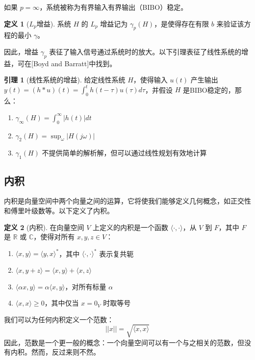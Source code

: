 \documentclass[UTF8,12pt,a4paper]{ctexart}
\theoremstyle{definition}
\newtheorem{definition}{定义}[section]
\newtheorem{lemma}{引理}[section]
\begin{document}
如果 $p=\infty$，系统被称为有界输入有界输出（BIBO）稳定。

\begin{definition}[$L_p$增益]
系统 $H$ 的 $L_p$ 增益记为 $\gamma_p(H)$，是使得存在有限 $b$ 来验证该方程的最小 $\gamma$。
\end{definition}

因此，增益 $\gamma_p$ 表征了输入信号通过系统时的放大。以下引理表征了线性系统的增益，可在[Boyd and Barratt]中找到。

\begin{lemma}[线性系统的增益]
给定线性系统 $H$，使得输入 $u(t)$ 产生输出 $y(t)=(h*u)(t)=\int_0^t h(t-\tau)u(\tau)d\tau$，并假设 $H$ 是BIBO稳定的，那么：
\begin{enumerate}
\item $\gamma_\infty(H) = \int_0^\infty |h(t)| dt$
\item $\gamma_2(H) = \sup_{\omega} |H(j\omega)|$
\item $\gamma_1(H)$ 不提供简单的解析解，但可以通过线性规划有效地计算
\end{enumerate}
\end{lemma}

\subsection{内积}

内积是向量空间中两个向量之间的运算，它将使我们能够定义几何概念，如正交性和傅里叶级数等。以下定义了内积。

\begin{definition}[内积]
在向量空间 $V$ 上定义的内积是一个函数 $\langle \cdot, \cdot \rangle$，从 $V$ 到 $F$，其中 $F$ 是 $\mathbb{R}$ 或 $\mathbb{C}$，使得对所有 $x, y, z \in V$：
\begin{enumerate}
\item $\langle x, y \rangle = \langle y, x \rangle^*$，其中 $\langle \cdot, \cdot \rangle^*$ 表示复共轭
\item $\langle x, y+z \rangle = \langle x, y \rangle + \langle x, z \rangle$
\item $\langle \alpha x, y \rangle = \alpha \langle x, y \rangle$，对所有标量 $\alpha$
\item $\langle x, x \rangle \geq 0$，其中仅当 $x=0_V$ 时取等号
\end{enumerate}
\end{definition}

我们可以为任何内积定义一个范数：
\[
||x|| = \sqrt{\langle x, x \rangle}
\]
因此，范数是一个更一般的概念：一个向量空间可以有一个与之相关的范数，但没有内积。然而，反过来则不然。
\end{document}
